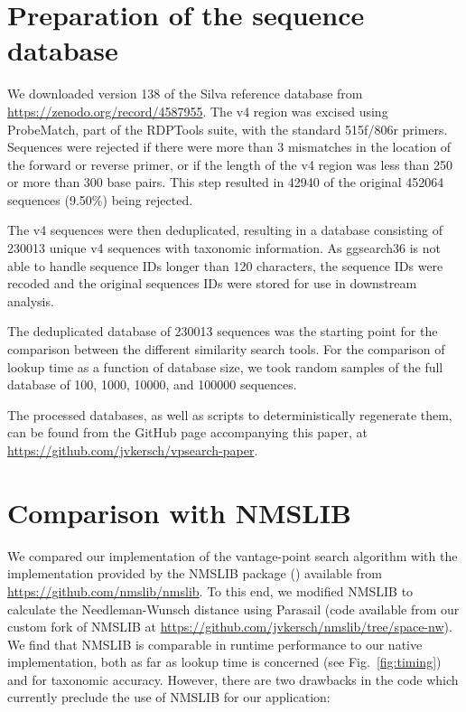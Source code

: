 \documentclass[11pt, a4paper]{article}
\begin{document}
\section{Preparation of the sequence database}

We downloaded version 138 of the Silva reference database from
\url{https://zenodo.org/record/4587955}. The v4 region was excised using
ProbeMatch, part of the RDPTools suite, with the standard 515f/806r
primers. Sequences were rejected if there were more than 3 mismatches in the
location of the forward or reverse primer, or if the length of the v4 region
was less than 250 or more than 300 base pairs. This step resulted in 42940 of
the original 452064 sequences (9.50\%) being rejected.

The v4 sequences were then deduplicated, resulting in a database consisting of
230013 unique v4 sequences with taxonomic information. As ggsearch36 is not
able to handle sequence IDs longer than 120 characters, the sequence IDs were
recoded and the original sequences IDs were stored for use in downstream
analysis.

The deduplicated database of 230013 sequences was the starting point for the
comparison between the different similarity search tools. For the comparison of
lookup time as a function of database size, we took random samples of the full
database of 100, 1000, 10000, and 100000 sequences.

The processed databases, as well as scripts to deterministically regenerate
them, can be found from the GitHub page accompanying this paper, at
\url{https://github.com/jvkersch/vpsearch-paper}.

\section{Comparison with NMSLIB}

We compared our implementation of the vantage-point search algorithm with the
implementation provided by the NMSLIB package
(\cite{2013-boytsov-EngineeringEfficientEffective}) available from
\url{https://github.com/nmslib/nmslib}. To this end, we modified NMSLIB to
calculate the Needleman-Wunsch distance using Parasail (code available from our
custom fork of NMSLIB at
\url{https://github.com/jvkersch/nmslib/tree/space-nw}). We find that NMSLIB is
comparable in runtime performance to our native implementation, both as far as
lookup time is concerned (see Fig.~\ref{fig:timing}) and for taxonomic
accuracy. However, there are two drawbacks in the code which currently preclude
the use of NMSLIB for our application:
\end{document}
